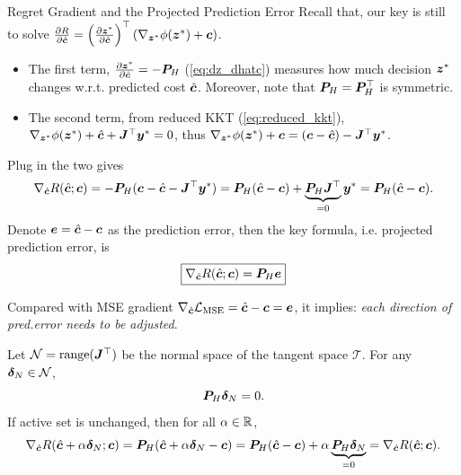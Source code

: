 \documentclass[10pt,aspectratio=169,xcolor=dvipsnames]{beamer}
\begin{document}
\begin{frame}[allowframebreaks]{Regret Gradient and the Projected Prediction Error}
    Recall that, our key is still to solve $\frac{\partial R}{\partial \hat{{\bm{c}}}} = \left( \frac{\partial {\bm{z}}^*}{\partial \hat{{\bm{c}}}} \right)^\top \left( \nabla_{{\bm{z}}^*} \phi({\bm{z}}^*) + {\bm{c}} \right)$.
    \begin{itemize}
        \item The first term, $\frac{\partial {\bm{z}}^*}{\partial \hat{{\bm{c}}}} = -{\bm{P}}_H$ (\eqref{eq:dz_dhatc}) measures how much decision ${\bm{z}}^*$ changes w.r.t. predicted cost $\hat{{\bm{c}}}$. Moreover, note that ${\bm{P}}_H = {\bm{P}}_H^\top$ is symmetric.
        \item The second term, from reduced KKT (\eqref{eq:reduced_kkt}), $\nabla_{{\bm{z}}^*} \phi({\bm{z}}^*) + \hat{{\bm{c}}} + {\bm{J}}^\top {\bm{y}}^* = 0$, thus $\nabla_{{\bm{z}}^*} \phi({\bm{z}}^*) + {\bm{c}} = ({\bm{c}} - \hat{{\bm{c}}}) - {\bm{J}}^\top {\bm{y}}^*$.
    \end{itemize}
    Plug in the two gives
    \begin{equation}
        \nabla_{\hat{{\bm{c}}}} R(\hat{{\bm{c}}}; {\bm{c}}) = -{\bm{P}}_H ({\bm{c}} - \hat{{\bm{c}}} - {\bm{J}}^\top {\bm{y}}^*) = {\bm{P}}_H (\hat{{\bm{c}}} - {\bm{c}}) + \underbrace{{\bm{P}}_H {\bm{J}}^\top}_{=0} {\bm{y}}^* = {\bm{P}}_H (\hat{{\bm{c}}} - {\bm{c}}).
    \end{equation}
    Denote ${\bm{e}} = \hat{{\bm{c}}} - {\bm{c}}$ as the prediction error, then the key formula, i.e. projected prediction error, is
    \begin{equation}\label{eq:regret_gradient}\boxed{
        \nabla_{\hat{{\bm{c}}}} R(\hat{{\bm{c}}}; {\bm{c}}) = {\bm{P}}_H {\bm{e}}}
    \end{equation}

    Compared with MSE gradient $\nabla_{\hat{{\bm{c}}}} \mathcal{L}_{\text{MSE}} = \hat{{\bm{c}}} - {\bm{c}} = {\bm{e}}$, it implies: \emph{each direction of pred.error needs to be adjusted}.

    \break

    \begin{corollary}\label{cor:normal_invariance}
        Let $\mathcal{N} = \operatorname{range}({\bm{J}}^\top)$ be the normal space of the tangent space $\mathcal{T}$. For any ${\bm{\delta}}_N \in \mathcal{N}$,
        \begin{equation}\label{eq:normal_invariance}
            {\bm{P}}_H {\bm{\delta}}_N = 0 .
        \end{equation}
         If active set is unchanged, then for all $\alpha \in \mathbb{R}$,
    \begin{equation}
        \nabla_{\hat{{\bm{c}}}} R(\hat{{\bm{c}}} + \alpha {\bm{\delta}}_N; {\bm{c}}) = {\bm{P}}_H (\hat{{\bm{c}}} + \alpha {\bm{\delta}}_N - {\bm{c}}) = {\bm{P}}_H (\hat{{\bm{c}}} - {\bm{c}}) + \alpha \underbrace{{\bm{P}}_H {\bm{\delta}}_N}_{=0} = \nabla_{\hat{{\bm{c}}}} R(\hat{{\bm{c}}}; {\bm{c}}).
    \end{equation}
    \end{corollary}


\end{frame}
\end{document}

